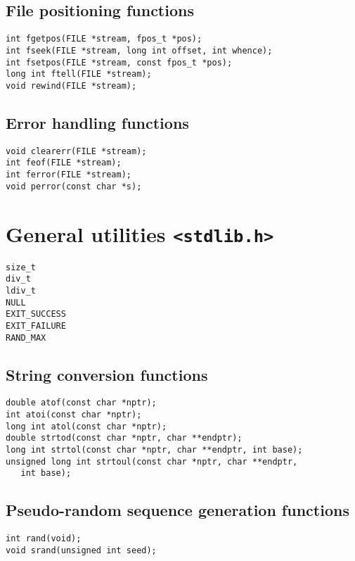 \documentclass[a4paper,11pt,draft]{article}
\begin{document}
\subsection*{File positioning functions}

\begin{verbatim}
int fgetpos(FILE *stream, fpos_t *pos);
int fseek(FILE *stream, long int offset, int whence);
int fsetpos(FILE *stream, const fpos_t *pos);
long int ftell(FILE *stream);
void rewind(FILE *stream);
\end{verbatim}

\subsection*{Error handling functions}

\begin{verbatim}
void clearerr(FILE *stream);
int feof(FILE *stream);
int ferror(FILE *stream);
void perror(const char *s);
\end{verbatim}

\section*{General utilities {\tt <stdlib.h>}}

\begin{verbatim}
size_t
div_t
ldiv_t
NULL
EXIT_SUCCESS
EXIT_FAILURE
RAND_MAX
\end{verbatim}

\subsection*{String conversion functions}

\begin{verbatim}
double atof(const char *nptr);
int atoi(const char *nptr);
long int atol(const char *nptr);
double strtod(const char *nptr, char **endptr);
long int strtol(const char *nptr, char **endptr, int base);
unsigned long int strtoul(const char *nptr, char **endptr,
   int base);
\end{verbatim}

\subsection*{Pseudo-random sequence generation functions}

\begin{verbatim}
int rand(void);
void srand(unsigned int seed);
\end{verbatim}
\end{document}
